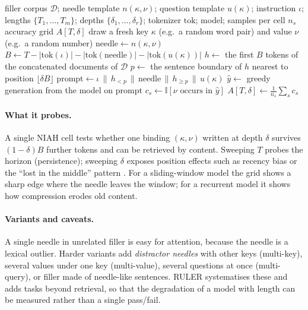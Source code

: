 \begin{algorithm}[htb]
\caption{Constructing a needle-in-a-haystack test grid}\label{alg:c02-niah}
\begin{algorithmic}[1]
\Require filler corpus $\mathcal{D}$; needle template $n(\kappa,\nu)$; question template $u(\kappa)$;
  instruction $\iota$; lengths $\{T_1,\dots,T_m\}$; depths $\{\delta_1,\dots,\delta_r\}$; tokenizer
  $\mathrm{tok}$; model; samples per cell $n_s$
\Ensure accuracy grid $A[T,\delta]$
    \State draw a fresh key $\kappa$ (e.g.\ a random word pair) and value $\nu$ (e.g.\ a random number)
    \State $\mathrm{needle} \gets n(\kappa,\nu)$
    \State $B \gets T - |\mathrm{tok}(\iota)| - |\mathrm{tok}(\mathrm{needle})| - |\mathrm{tok}(u(\kappa))|$
    \State $h \gets$ the first $B$ tokens of the concatenated documents of $\mathcal{D}$
    \State $p \gets$ the sentence boundary of $h$ nearest to position $\lfloor\delta B\rfloor$
    \State $\mathrm{prompt} \gets \iota \,\|\, h_{<p} \,\|\, \mathrm{needle} \,\|\, h_{\ge p} \,\|\, u(\kappa)$
    \State $\hat{y} \gets$ greedy generation from the model on $\mathrm{prompt}$
    \State $c_s \gets \mathbb{I}[\nu \text{ occurs in } \hat{y}]$
  \EndFor
  \State $A[T,\delta] \gets \frac{1}{n_s}\sum_{s} c_s$
\EndFor
\end{algorithmic}
\end{algorithm}

\paragraph{What it probes.} A single NIAH cell tests whether one binding $(\kappa,\nu)$ written at
depth $\delta$ survives $(1-\delta)B$ further tokens and can be retrieved by content. Sweeping $T$
probes the horizon (persistence); sweeping $\delta$ exposes position effects such as recency bias
or the ``lost in the middle'' pattern \citep{c02-liu2024lost}. For a sliding-window model the grid
shows a sharp edge where the needle leaves the window; for a recurrent model it shows how
compression erodes old content.

\paragraph{Variants and caveats.} A single needle in unrelated filler is easy for attention, because the
needle is a lexical outlier. Harder variants add
\emph{distractor needles} with other keys (multi-key), several values under one key (multi-value),
several questions at once (multi-query), or filler made of needle-like sentences. RULER
\citep{hsieh2024ruler} systematises these and adds tasks beyond retrieval, so that the degradation
of a model with length can be measured rather than a single pass/fail.

